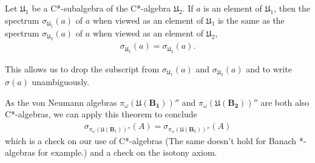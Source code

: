 \begin{theorem}
    Let $\mathfrak{U}_1$ be a C*-subalgebra of the C*-algebra $\mathfrak{U}_2$. If $a$ is an element of $\mathfrak{U}_1$, then the spectrum $\sigma_{\mathfrak{U}_1}(a)$ of $a$ when viewed as an element of $\mathfrak{U}_1$ is the same as the spectrum $\sigma_{\mathfrak{U}_2}(a)$ of $a$ when viewed as an element of $\mathfrak{U}_2$,
    \begin{align}
        \sigma_{\mathfrak{U}_1}(a) = \sigma_{\mathfrak{U}_2}(a).
    \end{align}
\end{theorem}
\noindent This allows us to drop the subscript from $\sigma_{\mathfrak{U}_1}(a)$ and $\sigma_{\mathfrak{U}_2}(a)$ and to write $\sigma(a)$ unambiguously.

As the von Neumann algebras $\pi_{\omega}(\mathfrak{U}(\mathbf{B_1}))''$ and $\pi_{\omega}(\mathfrak{U}(\mathbf{B_2}))''$ are both also C*-algebras, we can apply this theorem to conclude
\begin{align}
    \sigma_{\pi_\omega(\mathfrak{U}(\mathbf{B}_1))''}(A) = \sigma_{\pi_\omega(\mathfrak{U}(\mathbf{B}_2))''}(A)
\end{align}
which is a check on our use of C*-algebras (The same doesn't hold for Banach *-algebras for example.) and a check on the isotony axiom.
